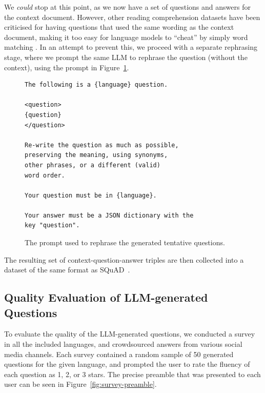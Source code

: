 \documentclass[10pt, a4paper]{article}
\begin{document}
We \textit{could} stop at this point, as we now have a set of questions and answers for the context document. However, other reading comprehension datasets have been criticised for having questions that used the same wording as the context document, making it too easy for language models to ``cheat'' by simply word matching \cite{weissenborn2017making, jia2017adversarial}. In an attempt to prevent this, we proceed with a separate rephrasing stage, where we prompt the same LLM to rephrase the question (without the context), using the prompt in Figure~\ref{fig:rephrasing-prompt}.

\begin{figure}
\scriptsize
\begin{verbatim}
The following is a {language} question.

<question>
{question}
</question>

Re-write the question as much as possible,
preserving the meaning, using synonyms,
other phrases, or a different (valid)
word order.

Your question must be in {language}.

Your answer must be a JSON dictionary with the
key "question".
\end{verbatim}
\caption{The prompt used to rephrase the generated tentative questions.}
\label{fig:rephrasing-prompt}
\end{figure}

The resulting set of context-question-answer triples are then collected into a dataset of the same format as SQuAD~.


\subsection{Quality Evaluation of LLM-generated Questions}
\label{sec:quality-evaluation}

To evaluate the quality of the LLM-generated questions, we conducted a survey in all the included languages, and crowdsourced answers from various social media channels. Each survey contained a random sample of 50 generated questions for the given language, and prompted the user to rate the fluency of each question as 1, 2, or 3 stars. The precise preamble that was presented to each user can be seen in Figure~\ref{fig:survey-preamble}.
\end{document}
